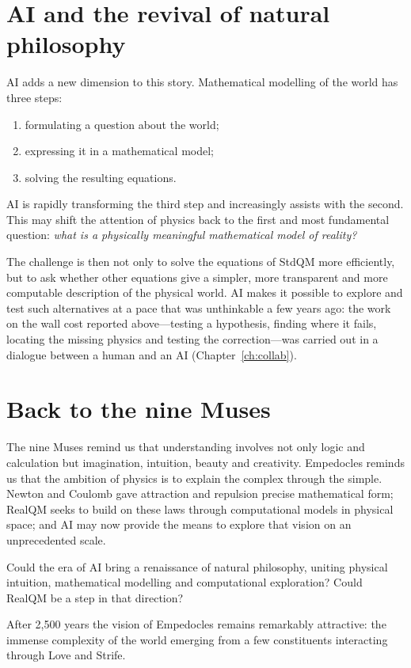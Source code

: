\section{AI and the revival of natural philosophy}\label{sec:muses-ai}

AI adds a new dimension to this story. Mathematical modelling of the world has three steps:
\begin{enumerate}
\item formulating a question about the world;
\item expressing it in a mathematical model;
\item solving the resulting equations.
\end{enumerate}
AI is rapidly transforming the third step and increasingly assists with the second. This may shift the
attention of physics back to the first and most fundamental question: \emph{what is a physically meaningful
mathematical model of reality?}

The challenge is then not only to solve the equations of StdQM more efficiently, but to ask whether other
equations give a simpler, more transparent and more computable description of the physical world. AI makes it
possible to explore and test such alternatives at a pace that was unthinkable a few years ago: the work on
the wall cost reported above---testing a hypothesis, finding where it fails, locating the missing physics and
testing the correction---was carried out in a dialogue between a human and an AI
(Chapter~\ref{ch:collab}).

\section{Back to the nine Muses}\label{sec:back-to-muses}

The nine Muses remind us that understanding involves not only logic and calculation but imagination,
intuition, beauty and creativity. Empedocles reminds us that the ambition of physics is to explain the complex
through the simple. Newton and Coulomb gave attraction and repulsion precise mathematical form; RealQM seeks to
build on these laws through computational models in physical space; and AI may now provide the means to
explore that vision on an unprecedented scale.

Could the era of AI bring a renaissance of natural philosophy, uniting physical intuition, mathematical
modelling and computational exploration? Could RealQM be a step in that direction?

After 2{,}500 years the vision of Empedocles remains remarkably attractive: the immense complexity of the
world emerging from a few constituents interacting through Love and Strife.
